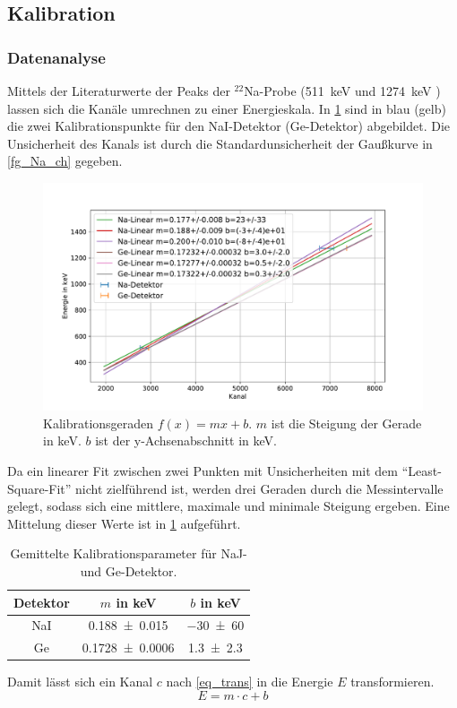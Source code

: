 \documentclass[
	a4paper,
	12pt,
	pagesize,
	ngerman
]{scrartcl}
\begin{document}
	\subsection{Kalibration}
	\subsubsection{Datenanalyse}
  Mittels der Literaturwerte der Peaks der $^{22}$Na-Probe (\SI{511}{keV} und \SI{1274}{keV} \cite{Anleitung}) lassen sich die Kanäle umrechnen zu einer Energieskala.
	In \cref{fg_kali_mix} sind in blau (gelb) die zwei Kalibrationspunkte für den NaI-Detektor (Ge-Detektor) abgebildet.
	Die Unsicherheit des Kanals ist durch die Standardunsicherheit der Gaußkurve in \cref{fg_Na_ch} gegeben.

	\begin{figure}[H]
			\includegraphics[width= 0.8 \linewidth]{img/kali_mix.pdf}
			\caption{
				Kalibrationsgeraden $f(x)=mx+b$.
				$m$ ist die Steigung der Gerade in \si{keV}.
				$b$ ist der y-Achsenabschnitt in \si{keV}.
			}
			\label{fg_kali_mix}
	\end{figure}

	Da ein linearer Fit zwischen zwei Punkten mit Unsicherheiten mit dem \enquote{Least-Square-Fit} nicht zielführend ist, werden drei Geraden durch die Messintervalle gelegt, sodass sich eine mittlere, maximale und minimale Steigung ergeben. %
	Eine Mittelung dieser Werte ist in \cref{tb_kali_avg} aufgeführt.

\begin{table}[H]
		\centering
		\begin{tabular}{c | c | c  }
			 Detektor& $m$ in \si{keV}& $b$ in \si{keV} \\ \hline
			 NaI & \SI{0.188+-0.015}{} & \SI{-30+-60}{} \\
			 Ge & \SI{0.1728+-0.0006}{} & \SI{1.3+-2.3}{} \\
		\end{tabular}
		\caption{
		Gemittelte Kalibrationsparameter für NaJ- und Ge-Detektor.
		}
		\label{tb_kali_avg}
\end{table}
Damit lässt sich ein Kanal $c$ nach \cref{eq_trans} in die Energie $E$ transformieren.
\begin{equation}
	\label{eq_trans}
	E = m\cdot c + b
\end{equation}
\end{document}

